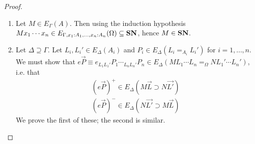 \begin{proof}
\begin{enumerate}
\begin{enumerate}
Now, let $\delta \in E_\Delta(x \vec{M})$.  We must show that $(x \vec{M}) \{\} ^+ \delta \in E_\Delta(x \vec{M})$,
i.e. $(\reff{x}_{M_1 M_1} M_1 \{\}_{M_2 M_2} \cdots_{M_n M_n} M_n\{\})^+ \delta \in E_\Delta(x \vec{M})$.
Well-typedness is easy, and strong normalization follows from the fact that each $M_i$ and $M_i \{\}$ is strongly
normalizing by the induction hypothesis (2) and (4).  (Note that $\reff{x}$ cannot be part of a redex, as it is not closed.)
\item
Given $M_i \in E_\Delta(A_i)$ for $1 \leq i \leq k$, and $N_j, N_j' \in E_\Delta(A_j)$ and $P_j \in E_\Delta(M_j =_{A_j} N_j)$ for
$k < j \leq n$, we must show that \\
$(x M_1 \cdots M_k)\{\}_{N_{k+1}N_{k+1}'} (P_{k+1})_{N_{k+2}N_{k+2}'} \cdots_{N_n N_n'} P_n \in E_\Delta(x \vec{M} \vec{N} =_\Omega x \vec{M} \vec{N'})$,
i.e.
\begin{align*}
(\reff{x}_{M_1 M_1} M_1\{\} \cdots_{M_k M_k} M_k\{\}_{M_{k+1} N_{k+1}} P_{k+1} \cdots_{M_n N_n} P_n)^+ \\
\in E_\Delta(x \vec{M} \vec{N} \supset x \vec{M} \vec{N'}) \\
(\reff{x}_{M_1 M_1} M_1\{\} \cdots_{M_k M_k} M_k\{\}_{M_{k+1} N_{k+1}} P_{k+1} \cdots_{M_n N_n} P_n)^- \\
\in E_\Delta(x \vec{M} \vec{N'} \supset x \vec{M} \vec{N})
\end{align*}
The proof is similar to the previous part.
\end{enumerate}
\item
Let $M \in E_\Gamma(A)$.  Then using the induction hypothesis $M x_1 \cdots x_n \in E_{\Gamma, x_1 : A_1, \ldots, x_n : A_n}(\Omega) \subseteq \mathbf{SN}$,
hence $M \in \mathbf{SN}$.
\item
Let $\Delta \supseteq \Gamma$.  Let $L_i, L_i' \in E_\Delta(A_i)$ and
$P_i \in E_\Delta(L_i =_{A_i} L_i')$ for $i = 1, \ldots, n$.  We must show that
$e \vec{P} \equiv e_{L_1 L_1'} P_1 \cdots_{L_n L_n'} P_n \in E_\Delta(M L_1 \cdots L_n =_{\Omega} N L_1' \cdots L_n')$, i.e. that
\begin{align*}
(e \vec{P})^+ \in E_\Delta(M \vec{L} \supset N \vec{L'}) \\
(e \vec{P})^- \in E_\Delta(N \vec{L'} \supset M \vec{L})
\end{align*}
We prove the first of these; the second is similar.


\end{enumerate}
\end{proof}

